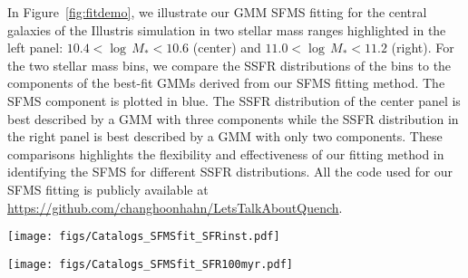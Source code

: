 \documentclass[preprint2,tighten]{aastex62}
\begin{document}
In Figure~\ref{fig:fitdemo}, we illustrate our GMM SFMS fitting for the 
central galaxies of the Illustris simulation in two stellar mass 
ranges highlighted in the left panel: $10.4 < \log\,M_* < 10.6$ (center) 
and $11.0 < \log\,M_* < 11.2$ (right). For the two stellar mass bins, 
we compare the SSFR distributions of the bins to the components of the 
best-fit GMMs derived from our SFMS fitting method. The SFMS component 
is plotted in blue. The SSFR distribution of the center panel is best 
described by a GMM with three components while the SSFR distribution 
in the right  panel is best described by a GMM with only two components.
These comparisons highlights the flexibility and effectiveness 
of our fitting method in identifying the SFMS for different SSFR 
distributions. All the code used for our SFMS fitting is publicly available 
at \url{https://github.com/changhoonhahn/LetsTalkAboutQuench}.

\begin{figure*}
\begin{center}
\texttt{[image: figs/Catalogs\_SFMSfit\_SFRinst.pdf]} 
\caption{Best-fit SFMS of the central galaxies in the Illustris, EAGLE, MUFASA, 
    and Santa Cruz SAM simulations as identified by our SFMS GMM fitting method 
    (Section~\ref{sec:sfmsfit}). The SFMSs above are fit from the instantaneous 
    SFR--$M_*$ relation. For reference, we include the best-fit SFMS of the SDSS 
    sample in the top right panel. The uncertainties of the best-fit SFMS are
    derived usig bootstrap resampling. When we compare the SFMS fits
    (bottom right panel), \emph{the SFMSs of the simulations have similar 
    overall stellar mass dependence, but their amplitude vary roughly by an 
    order of magnitude.}} \label{fig:sfmsfit_inst}
\end{center}
\end{figure*}

\begin{figure*}
\begin{center}
\texttt{[image: figs/Catalogs\_SFMSfit\_SFR100myr.pdf]} 
    \caption{Same as Figure~\ref{fig:sfmsfit_inst} but for the $100\,\mathrm{Myr}$ 
    SFR--$M_*$ relation. As in Figure~\ref{fig:sfmsfit_inst}, \emph{the SFMSs of the simulations have 
    similar stellar mass dependence but vary roughly by an order of magnitude in amplitude.}}
\label{fig:sfmsfit_100myr}
\end{center}
\end{figure*}
\end{document}
